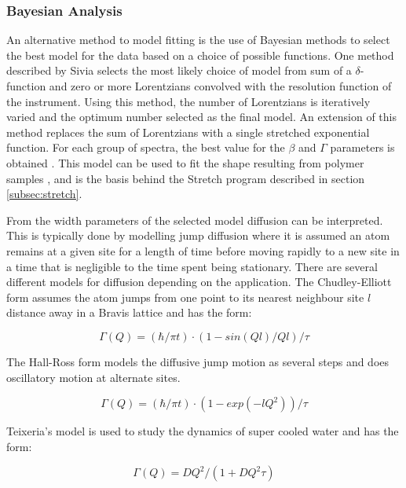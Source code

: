 \documentclass[paper=a4, fontsize=11pt]{scrartcl}	%
\numberwithin{equation}{section}															%
\numberwithin{figure}{section}																%
\numberwithin{table}{section}																%
\begin{document}
\subsubsection{Bayesian Analysis}
An alternative method to model fitting is the use of Bayesian methods to select the best model for the data based on a choice of possible functions. One method described by Sivia \citep{dssivia1992} selects the most likely choice of model from sum of a $\delta$-function and zero or more Lorentzians convolved with the resolution function of the instrument. Using this method, the number of Lorentzians is iteratively varied and the optimum number selected as the final model. An extension of this method replaces the sum of Lorentzians with a single stretched exponential function. For each group of spectra, the best value for the $\beta$ and $\Gamma$ parameters is obtained \citep{wshowells2010}. This model can be used to fit the shape resulting from polymer samples \citep{wshowells1996, higgins1977observation, higgins1977q}, and is the basis behind the Stretch program described in section \ref{subsec:stretch}.

From the width parameters of the selected model diffusion can be interpreted. This is typically done by modelling jump diffusion where it is assumed an atom remains at a given site for a length of time before moving rapidly to a new site in a time that is negligible to the time spent being stationary. There are several different models for diffusion depending on the application. The Chudley-Elliott form assumes the atom jumps from one point to its nearest neighbour site $l$ distance away in a Bravis lattice \citep{chudley1961neutron} and has the form:

\begin{equation}
\Gamma(Q) = (\hbar/\pi t) \cdot (1 - sin(Ql)/Ql)/\tau
\end{equation}

The Hall-Ross \citep{hall1981incoherent} form models the diffusive jump motion as several steps and does oscillatory motion at alternate sites.

\begin{equation}
\Gamma(Q) = (\hbar/\pi t) \cdot (1-exp(-lQ^2))/\tau
\end{equation}

Teixeria's model \citep{teixeira1985experimental} is used to study the dynamics of super cooled water and has the form:

\begin{equation}
\Gamma(Q) = DQ^2/(1 + DQ^2\tau)
\end{equation}
\end{document}
